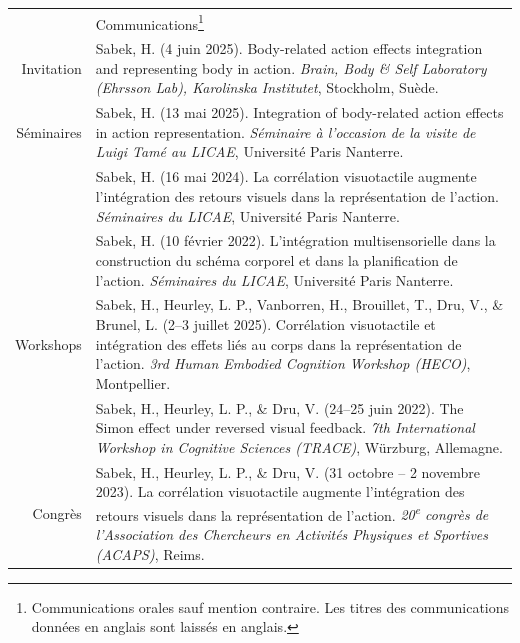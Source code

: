 \documentclass[a4paper, 11pt]{article}
\newcommand{\headingfont}{\Large\color{PineGreen}}
\newenvironment{SectionTable}[1]{
	\renewcommand*{\arraystretch}{1.1}
	\setlength{\tabcolsep}{8pt}
	\begin{longtable}{Rp{5.15in}} & #1 \\*}
{\end{longtable}\vspace{2pt}}
\begin{document}
\begin{SectionTable}{\headingfont Communications\footnote{Communications orales sauf mention contraire. Les titres des communications données en anglais sont laissés en anglais.}}
	Invitation &
	Sabek, H. (4 juin 2025). Body-related action effects integration and representing body in action.
	\textit{Brain, Body \& Self Laboratory (Ehrsson Lab), Karolinska Institutet}, Stockholm, Suède. \href{https://www.ehrssonlab.se/}{\faGlobe} \\

	Séminaires &
	Sabek, H. (13 mai 2025). Integration of body-related action effects in action representation.
	\textit{Séminaire à l'occasion de la visite de Luigi Tamé au LICAE}, Université Paris Nanterre. \\

	&
	Sabek, H. (16 mai 2024). La corrélation visuotactile augmente l'intégration des retours visuels dans la représentation de l'action.
	\textit{Séminaires du LICAE}, Université Paris Nanterre. \href{https://licae.parisnanterre.fr/actualites/seminaires}{\faGlobe} \\

	&
	Sabek, H. (10 février 2022). L'intégration multisensorielle dans la construction du schéma corporel et dans la planification de l'action.
	\textit{Séminaires du LICAE}, Université Paris Nanterre. \\

	Workshops &
	Sabek, H., Heurley, L. P., Vanborren, H., Brouillet, T., Dru, V., \& Brunel, L. (2--3 juillet 2025). Corrélation visuotactile et intégration des effets liés au corps dans la représentation de l'action.
	\textit{3rd Human Embodied Cognition Workshop (HECO)}, Montpellier. \href{https://heco2025.sciencesconf.org/}{\faGlobe} \\

	&
	Sabek, H., Heurley, L. P., \& Dru, V. (24--25 juin 2022). The Simon effect under reversed visual feedback.
	\textit{7th International Workshop in Cognitive Sciences (TRACE)}, Würzburg, Allemagne. \\

	Congrès &
	Sabek, H., Heurley, L. P., \& Dru, V. (31 octobre -- 2 novembre 2023). La corrélation visuotactile augmente l'intégration des retours visuels dans la représentation de l'action. \textit{20\textsuperscript{e} congrès de l'Association des Chercheurs en Activités Physiques et Sportives (ACAPS)}, Reims. \href{http://acaps2023.univ-reims.fr/programme/}{\faGlobe}\\


\end{SectionTable}
\end{document}
